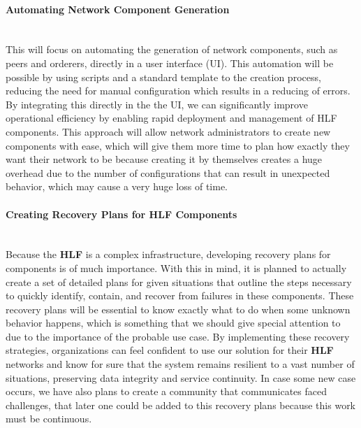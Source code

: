 \paragraph{Automating Network Component Generation}\mbox{}\\
This will focus on automating the generation of network components, such as peers and orderers, directly in a user interface (UI). This automation will be possible by using scripts and a standard template to the creation process, reducing the need for manual configuration which results in a reducing of errors. By integrating this directly in the the UI, we can significantly improve operational efficiency by enabling rapid deployment and management of HLF components. This approach will allow network administrators to create new components with ease, which will give them more time to plan how exactly they want their network to be because creating it by themselves creates a huge overhead due to the number of configurations that can result in unexpected behavior, which may cause a very huge loss of time.

\paragraph{Creating Recovery Plans for HLF Components}\mbox{}\\
Because the \textbf{HLF} is a complex infrastructure, developing recovery plans for components is of much importance. With this in mind, it is planned to actually  create a set of detailed plans for given situations that outline the steps necessary to quickly identify, contain, and recover from failures in these components. These recovery plans will be essential to know exactly what to do when some unknown behavior happens, which is something that we should give special attention to due to the importance of the probable use case. By implementing these recovery strategies, organizations can feel confident to use our solution for their \textbf{HLF} networks and know for sure that the system remains resilient to a vast number of situations, preserving data integrity and service continuity. In case some new case occurs, we have also plans to create a community that communicates faced challenges, that later one could be added to this recovery plans because this work must be continuous.

